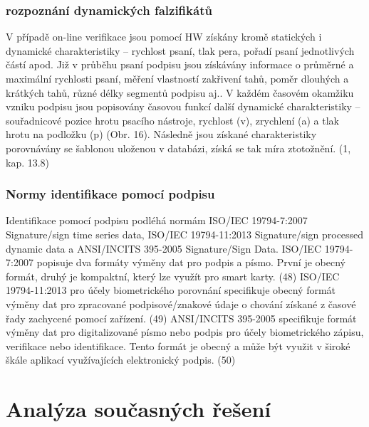 \subsection{rozpoznání dynamických falzifikátů}
V případě on-line verifikace jsou pomocí HW získány kromě statických i dynamické
charakteristiky – rychlost psaní, tlak pera, pořadí psaní jednotlivých částí apod. Již v průběhu
psaní podpisu jsou získávány informace o průměrné a maximální rychlosti psaní, měření
vlastností zakřivení tahů, poměr dlouhých a krátkých tahů, různé délky segmentů podpisu aj..
V každém časovém okamžiku vzniku podpisu jsou popisovány časovou funkcí další
dynamické charakteristiky – souřadnicové pozice hrotu psacího nástroje, rychlost (v),
zrychlení (a) a tlak hrotu na podložku (p) (Obr. 16). Následně jsou získané charakteristiky
porovnávány se šablonou uloženou v databázi, získá se tak míra ztotožnění. (1, kap. 13.8) %


\subsection{Normy identifikace pomocí podpisu}
Identifikace pomocí podpisu podléhá normám ISO/IEC 19794-7:2007 Signature/sign time
series data, ISO/IEC 19794-11:2013 Signature/sign processed dynamic data a ANSI/INCITS
395-2005 Signature/Sign Data.
ISO/IEC 19794-7:2007 popisuje dva formáty výměny dat pro podpis a písmo. První je obecný
formát, druhý je kompaktní, který lze využít pro smart karty. (48) %
ISO/IEC 19794-11:2013 pro účely biometrického porovnání specifikuje obecný formát
výměny dat pro zpracované podpisové/znakové údaje o chování získané z časové řady
zachycené pomocí zařízení. (49) %
ANSI/INCITS 395-2005 specifikuje formát výměny dat pro digitalizované písmo nebo podpis
pro účely biometrického zápisu, verifikace nebo identifikace. Tento formát je obecný a může
být využit v široké škále aplikací využívajících elektronický podpis. (50) %

\chapter{Analýza současných řešení}


